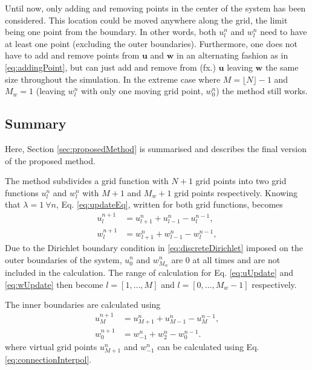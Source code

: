 Until now, only adding and removing points in the center of the system has been considered. This location could be moved anywhere along the grid, the limit being one point from the boundary. In other words, both $u_l^n$ and $w_l^n$ need to have at least one point (excluding the outer boundaries). Furthermore, one does not have to add and remove points from $\mathbf{u}$ and $\mathbf{w}$ in an alternating fashion as in \eqref{eq:addingPoint}, but can just add and remove from (fx.) $\mathbf{u}$ leaving $\mathbf{w}$ the same size throughout the simulation. In the extreme case where $M = \lfloor N\rfloor - 1$ and $M_w = 1$ (leaving $w_l^n$ with only one moving grid point, $w_0^n$) the method still works.
% 

\subsection{Summary}
Here, Section \ref{sec:proposedMethod} is summarised and describes the final version of the proposed method.

The method subdivides a grid function with $N+1$ grid points into two grid functions $u_l^n$ and $w_l^n$ with $M+1$ and $M_w+1$ grid points respectively. Knowing that $\lambda=1\ \forall n$, Eq. \eqref{eq:updateEq}, written for both grid functions, becomes 
\begin{subequations}\label{eq:uwUpdates}
    \begin{align}
        u_l^{n+1} &= u_{l+1}^n + u_{l-1}^n - u_l^{n-1},\label{eq:uUpdate}\\
        w_l^{n+1} &= w_{l+1}^n + w_{l-1}^n - w_l^{n-1}\label{eq:wUpdate},
    \end{align}
\end{subequations}
%
Due to the Dirichlet boundary condition in \eqref{eq:discreteDirichlet} imposed on the outer boundaries of the system, $u_0^n$ and $w_{M_w}^n$ are $0$ at all times and are not included in the calculation. The range of calculation for Eq. \eqref{eq:uUpdate} and \eqref{eq:wUpdate} then become $l = [1, \hdots, M]$ and $l = [0, \hdots, M_w - 1]$ respectively. 

The inner boundaries are calculated using
\begin{subequations}
    \begin{align}
        u_M^{n+1} &= u_{M+1}^n + u_{M-1}^n - u_M^{n-1},\\
        w_0^{n+1} &= w_{-1}^n + w_{2}^n - w_0^{n-1}.
    \end{align}
\end{subequations}
%
where virtual grid points $u_{M+1}^n$ and $w_{-1}^n$ can be calculated using Eq. \eqref{eq:connectionInterpol}.

